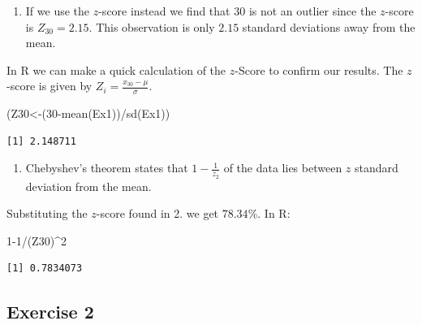 \documentclass[
  letterpaper,
  DIV=11,
  numbers=noendperiod]{scrreprt}
\newenvironment{Shaded}{\begin{snugshade}}{\end{snugshade}}
\newcommand{\DecValTok}[1]{\textcolor[rgb]{0.68,0.00,0.00}{#1}}
\newcommand{\FunctionTok}[1]{\textcolor[rgb]{0.28,0.35,0.67}{#1}}
\newcommand{\NormalTok}[1]{\textcolor[rgb]{0.00,0.23,0.31}{#1}}
\newcommand{\OtherTok}[1]{\textcolor[rgb]{0.00,0.23,0.31}{#1}}
\newcommand{\SpecialCharTok}[1]{\textcolor[rgb]{0.37,0.37,0.37}{#1}}
\providecommand{\tightlist}{%
  \setlength{\itemsep}{0pt}\setlength{\parskip}{0pt}}\usepackage{longtable,booktabs,array}
\begin{document}
\begin{enumerate}
\def\labelenumi{\arabic{enumi}.}
\setcounter{enumi}{1}
\tightlist
\item
  If we use the \(z\)-score instead we find that \(30\) is not an
  outlier since the \(z\)-score is \(Z_{30}=2.15\). This observation is
  only \(2.15\) standard deviations away from the mean.
\end{enumerate}

In R we can make a quick calculation of the \(z\)-Score to confirm our
results. The \(z\)-score is given by
\(Z_{i}=\frac{x_{30}-\mu}{\sigma}\).

\begin{Shaded}
\begin{Highlighting}[numbers=left,,]
\NormalTok{(Z30}\OtherTok{\textless{}{-}}\NormalTok{(}\DecValTok{30}\SpecialCharTok{{-}}\FunctionTok{mean}\NormalTok{(Ex1))}\SpecialCharTok{/}\FunctionTok{sd}\NormalTok{(Ex1))}
\end{Highlighting}
\end{Shaded}

\begin{verbatim}
[1] 2.148711
\end{verbatim}

\begin{enumerate}
\def\labelenumi{\arabic{enumi}.}
\setcounter{enumi}{2}
\tightlist
\item
  Chebyshev's theorem states that \(1-\frac{1}{z_{2}}\) of the data lies
  between \(z\) standard deviation from the mean.
\end{enumerate}

Substituting the \(z\)-score found in 2. we get \(78.34\)\%. In R:

\begin{Shaded}
\begin{Highlighting}[numbers=left,,]
\DecValTok{1{-}1}\SpecialCharTok{/}\NormalTok{(Z30)}\SpecialCharTok{\^{}}\DecValTok{2}
\end{Highlighting}
\end{Shaded}

\begin{verbatim}
[1] 0.7834073
\end{verbatim}

\hypertarget{exercise-2-9}{%
\subsection*{Exercise 2}\label{exercise-2-9}}
\end{document}
